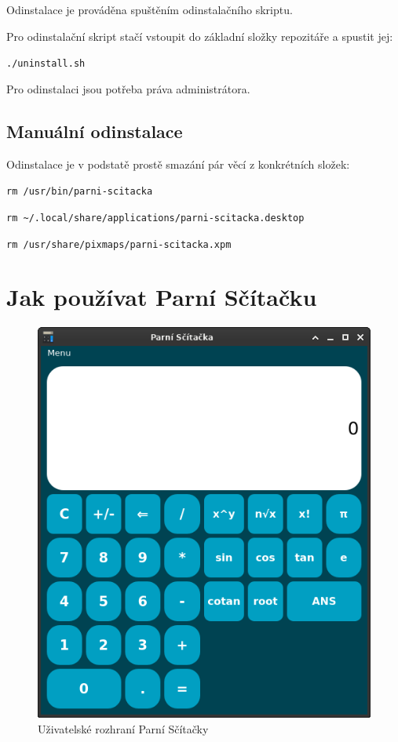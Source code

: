 \documentclass[a4paper]{article}
\begin{document}
Odinstalace je prováděna spuštěním odinstalačního skriptu.

Pro odinstalační skript stačí vstoupit do základní složky repozitáře a spustit jej:

\verb|./uninstall.sh|

Pro odinstalaci jsou potřeba práva administrátora.

\subsection*{Manuální odinstalace}

Odinstalace je v podstatě prostě smazání pár věcí z konkrétních složek:

\verb|rm /usr/bin/parni-scitacka|

\verb|rm ~/.local/share/applications/parni-scitacka.desktop|

\verb|rm /usr/share/pixmaps/parni-scitacka.xpm|

\pagebreak

\section*{Jak používat Parní Sčítačku}

\begin{figure}[ht]
	\begin{center}
		\includegraphics[scale=0.55]{../screenshot.png}
		\caption{Uživatelské rozhraní Parní Sčítačky}
	\end{center}
\end{figure}
\end{document}
